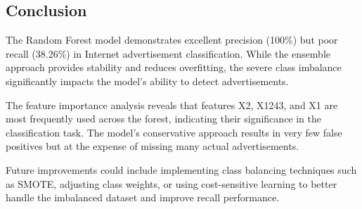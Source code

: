 \subsection{Conclusion}

The Random Forest model demonstrates excellent precision (100\%) but poor recall (38.26\%) in Internet advertisement classification. While the ensemble approach provides stability and reduces overfitting, the severe class imbalance significantly impacts the model's ability to detect advertisements.

The feature importance analysis reveals that features X2, X1243, and X1 are most frequently used across the forest, indicating their significance in the classification task. The model's conservative approach results in very few false positives but at the expense of missing many actual advertisements.

Future improvements could include implementing class balancing techniques such as SMOTE, adjusting class weights, or using cost-sensitive learning to better handle the imbalanced dataset and improve recall performance.